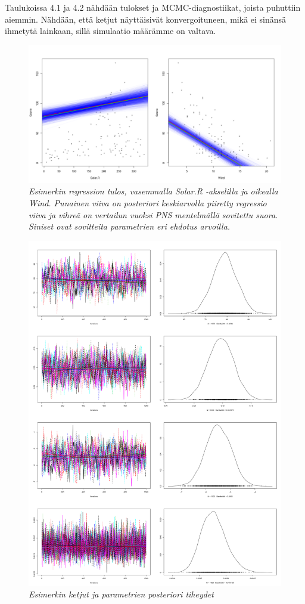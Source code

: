 Taulukoissa 4.1 ja 4.2 nähdään tulokset ja MCMC-diagnostiikat, joista puhuttiin aiemmin. Nähdään, että ketjut näyttäisivät konvergoituneen, mikä ei sinänsä ihmetytä lainkaan, sillä simulaatio määrämme on valtava.
\begin{figure}[h!]
	\includegraphics[width=\textwidth]{gibbsexample}
	\caption[Regressio]{\textit{Esimerkin regression tulos, vasemmalla Solar.R -akselilla ja oikealla Wind. Punainen viiva on posteriori keskiarvolla piiretty regressio viiva ja vihreä on vertailun vuoksi PNS mentelmällä sovitettu suora. Siniset ovat sovitteita parametrien eri ehdotus arvoilla.}}
	\label{kuva1}
\end{figure}

\begin{figure}[h!]
	\includegraphics[width=\textwidth]{gibbs2}
	\caption[]{\textit{Esimerkin ketjut ja parametrien posteriori tiheydet}}
	\label{kuva1}
\end{figure}




